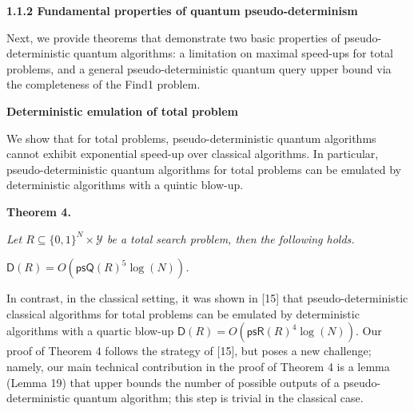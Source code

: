 \documentclass[10pt,a4paper]{article}
\begin{document}
\par\medskip\noindent\textbf{
1.1.2 Fundamental properties of quantum pseudo-determinism}\par




Next, we provide theorems that demonstrate two basic properties of pseudo-deterministic quantum algorithms: a limitation on maximal speed-ups for total problems, and a general pseudo-deterministic quantum query upper bound via the completeness of the Find1 problem.\par




\par\medskip\noindent\textbf{Deterministic emulation of total problem}\par




We show that for total problems, pseudo-deterministic quantum algorithms cannot exhibit exponential speed-up over classical algorithms. In particular, pseudo-deterministic quantum algorithms for total problems can be emulated by deterministic algorithms with a quintic blow-up.\par






\par\medskip\noindent\textbf{
\textbf{Theorem 4}\textbf{.}
}\par



\emph{Let ${R}\subseteq\{0,1\}^{N}\times\mathcal{Y}$ be a total search problem, then the following holds.}\par




$\mathsf{D}(R)=O(\mathsf{psQ}(R)^{5}\log(N))$\emph{.}\par







In contrast, in the classical setting, it was shown in [15] that pseudo-deterministic classical algorithms for total problems can be emulated by deterministic algorithms with a quartic blow-up $\mathsf{D}(R)=O(\mathsf{psR}(R)^{4}\log(N))$. Our proof of Theorem 4 follows the strategy of [15], but poses a new challenge; namely, our main technical contribution in the proof of Theorem 4 is a lemma (Lemma 19) that upper bounds the number of possible outputs of a pseudo-deterministic quantum algorithm; this step is trivial in the classical case.\par
\end{document}
